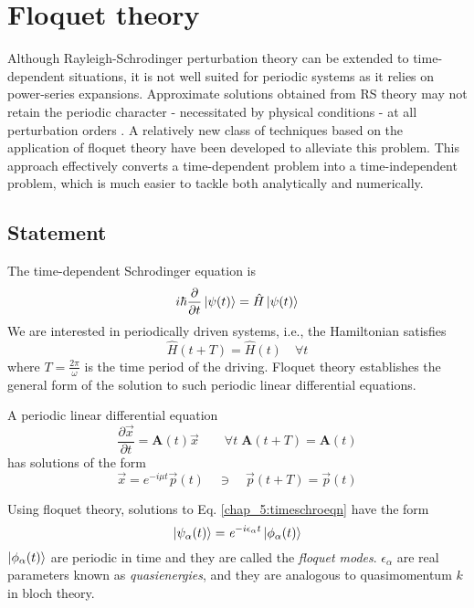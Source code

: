 %

\chapter{Floquet theory}\label{ch:fl}
Although Rayleigh-Schrodinger perturbation theory can be extended to time-dependent situations, it is not well suited for periodic systems as it relies on power-series
expansions. Approximate solutions obtained from RS theory may not retain the periodic character - necessitated by physical conditions - at all perturbation orders \cite{hanggi1998driven}.
A relatively new class of techniques based on the application of floquet theory have been developed to alleviate this problem. This approach effectively converts a time-dependent
problem into a time-independent problem, which is much easier to tackle both analytically and numerically.
\section{Statement}
The time-dependent Schrodinger equation is
\begin{equation}
  \label{chap_5:timeschroeqn}i\hbar\frac{\partial}{\partial t}\ket{\psi (t)} = \hat{H}\ket{\psi (t)}
\end{equation}We are interested in periodically driven systems, i.e., the Hamiltonian satisfies
\begin{equation}
  \hat{H}(t+T) = \hat{H}(t) \quad \forall t
\end{equation} where $T = \frac{2\pi}{\omega}$ is the time period of the driving. Floquet theory establishes the general form of the solution 
to such periodic linear differential equations.
\newline
\begin{theorem} A periodic linear differential equation 
  \begin{equation*}
  \frac{\partial\vec{x}}{\partial t} = \mathbf{A}(t) \vec{x} \qquad \forall t \; \mathbf{A}(t+T) = \mathbf{A}(t)
  \end{equation*} has solutions of the form 
  \begin{equation*}
    \vec{x} = \mathit{e}^{-i \mu t} \vec{p}(t) \quad \ni \quad \vec{p}(t+T) = \vec{p}(t)
  \end{equation*}
\end{theorem}
Using floquet theory, solutions to Eq. \eqref{chap_5:timeschroeqn} have the form
\begin{equation}
 \label{chap_5:floquetstate}\ket{\psi_{\alpha}(t)} = \mathit{e}^{-i \epsilon_{\alpha} t} \ket{\phi_{\alpha}(t)}
\end{equation} $\ket{\phi_{\alpha}(t)}$ are periodic in time and they are called the \emph{floquet modes}. $\epsilon_{\alpha}$ are real parameters known as \emph{quasienergies}, 
and they are analogous to quasimomentum $k$ in bloch theory. 

